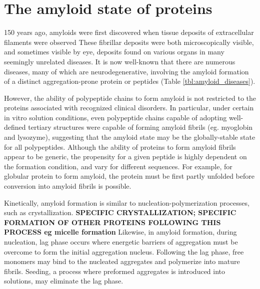 
\section{The amyloid state of proteins}
\label{sec:amyloid}

150 years ago, amyloids were first discovered when tissue deposits of extracellular filaments were observed\cite{Haass:2007db,Sipe:2000fs} These fibrillar deposits were both microscopically visible, and sometimes visible by eye, deposits found on various organs in many seemingly unrelated diseases. It is now well-known that there are numerous diseases, many of which are neurodegenerative, involving the amyloid formation of a distinct aggregation-prone protein or peptides (Table \ref{tbl:amyloid_diseases}).

However, the ability of polypeptide chains to form amyloid is not restricted to the proteins associated with recognized clinical disorders. In particular, under certain in vitro solution conditions, even polypeptide chains capable of adopting well-defined tertiary structures were capable of forming amyloid fibrils (eg. myoglobin and lysozyme), suggesting that the amyloid state may be the globally-stable state for all polypeptides.  Although the ability of proteins to form amyloid fibrils appear to be generic, the propensity for a given peptide is highly dependent on the formation condition, and vary for different sequences. For example, for globular protein to form amyloid, the protein must be first partly unfolded before conversion into amyloid fibrils is possible.

Kinetically, amyloid formation is similar to nucleation-polymerization processes, such as crystallization. 
\textbf{SPECIFIC CRYSTALLIZATION; SPECIFIC FORMATION OF OTHER PROTEINS FOLLOWING THIS PROCESS eg micelle formation} Likewise, in amyloid formation, during nucleation, lag phase occurs where energetic barriers of aggregation must be overcome to form the initial aggregation nucleus. Following the lag phase, free monomers may bind to the nucleated aggregates and polymerize into mature fibrils.\cite{Murphy:2002fe} Seeding, a process where preformed aggregates is introduced into solutions, may eliminate the lag phase.\cite{harper and lansbury 1997, Jarrett and lansbury 1993}  

